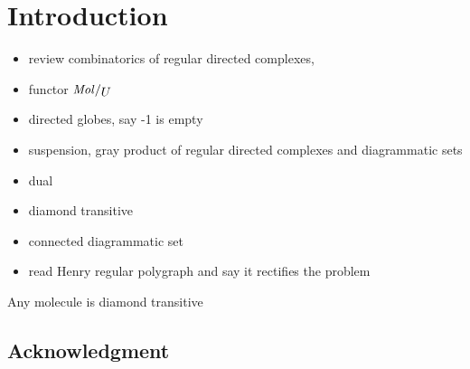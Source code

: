 \section*{Introduction}

\begin{itemize}
    \item review combinatorics of regular directed complexes, 
    \item functor \( \molecin{U} \)
    \item directed globes, say -1 is empty
    \item suspension, gray product of regular directed complexes and diagrammatic sets
    \item dual
    \item diamond transitive
    \item connected diagrammatic set
    \item read Henry regular polygraph and say it rectifies the problem
\end{itemize}

\begin{lem} \label{lem:diamond_transitive}
    Any molecule is diamond transitive
\end{lem}

\subsection*{Acknowledgment}

